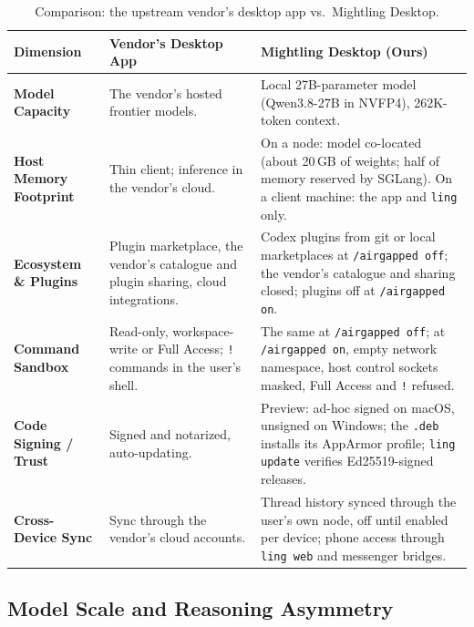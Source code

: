 \documentclass[11pt]{article}
\newcommand{\code}[1]{\texttt{#1}}
\newcommand{\agon}{\code{/airgapped on}}
\newcommand{\agoff}{\code{/airgapped off}}
\begin{document}
\begin{table}[t]
\centering
\small
\caption{Comparison: the upstream vendor's desktop app vs.\ Mightling Desktop.}
\label{tab:comparison-matrix}
\begin{tabularx}{\linewidth}{p{3.1cm} p{5.0cm} X}
\toprule
\textbf{Dimension} & \textbf{Vendor's Desktop App} & \textbf{Mightling Desktop (Ours)} \\
\midrule
\textbf{Model Capacity} & The vendor's hosted frontier models. & Local 27B-parameter model (Qwen3.8-27B in NVFP4), 262K-token context. \\
\textbf{Host Memory Footprint} & Thin client; inference in the vendor's cloud. & On a node: model co-located (about 20\,GB of weights; half of memory reserved by SGLang). On a client machine: the app and \code{ling} only. \\
\textbf{Ecosystem \& Plugins} & Plugin marketplace, the vendor's catalogue and plugin sharing, cloud integrations. & Codex plugins from git or local marketplaces at \agoff; the vendor's catalogue and sharing closed; plugins off at \agon. \\
\textbf{Command Sandbox} & Read-only, workspace-write or Full Access; \code{!}\,commands in the user's shell. & The same at \agoff; at \agon, empty network namespace, host control sockets masked, Full Access and \code{!} refused. \\
\textbf{Code Signing / Trust} & Signed and notarized, auto-updating. & Preview: ad-hoc signed on macOS, unsigned on Windows; the \code{.deb} installs its AppArmor profile; \code{ling update} verifies Ed25519-signed releases. \\
\textbf{Cross-Device Sync} & Sync through the vendor's cloud accounts. & Thread history synced through the user's own node, off until enabled per device; phone access through \code{ling web} and messenger bridges. \\
\bottomrule
\end{tabularx}
\end{table}

\subsection{Model Scale and Reasoning Asymmetry}
\end{document}
